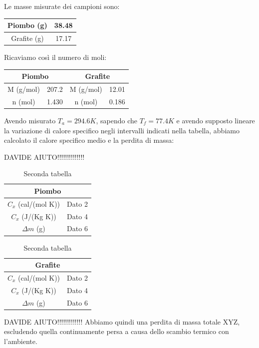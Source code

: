 \documentclass[a4paper,12pt]{article}
\begin{document}
Le masse misurate dei campioni sono:

\begin{table}[h]
    \centering
    \begin{tabular}{|c|c|} \hline
        Piombo (g) & 38.48 \\ \hline
        Grafite (g) & 17.17 \\ \hline
    \end{tabular}
\end{table}

Ricaviamo così il numero di moli:
\begin{table}[h]
    \centering
    \begin{tabular}{|c|c|c|c|} 
        \hline
        \multicolumn{2}{|c|}{\textbf{Piombo}} & \multicolumn{2}{c|}{\textbf{Grafite}} \\ \hline
        M (g/mol) & 207.2 & M (g/mol) & 12.01 \\ \hline
        n (mol) & 1.430 & n (mol) & 0.186 \\ \hline
    \end{tabular}
\end{table}

Avendo misurato $T_a = 294.6K$, sapendo che $T_f = 77.4K$ e avendo supposto lineare la variazione di calore
specifico negli intervalli indicati nella tabella, abbiamo calcolato il calore specifico medio e la perdita
di massa: 


DAVIDE AIUTO!!!!!!!!!!!!!!
\begin{table}[H]
    \centering
    \begin{minipage}{0.45\textwidth}
        \centering
        \begin{tabular}{|c|c|}
            \hline
            \multicolumn{2}{|c|}{\textbf{Piombo}} \\ \hline
            $C_x$ (cal/(mol K)) & Dato 2 \\ 
            $C_x$ (J/(Kg K)) & Dato 4 \\ \hline
            $\Delta m$ (g) & Dato 6 \\ \hline
        \end{tabular}
        \caption{Prima tabella}
    \end{minipage}
    \hfill
    \begin{minipage}{0.45\textwidth}
        \centering
        \begin{tabular}{|c|c|}
            \hline
            \multicolumn{2}{|c|}{\textbf{Grafite}} \\ \hline
            $C_x$ (cal/(mol K)) & Dato 2 \\ 
            $C_x$ (J/(Kg K)) & Dato 4 \\ \hline
            $\Delta m$ (g) & Dato 6 \\ \hline
        \end{tabular}
        \caption{Seconda tabella}
    \end{minipage}
\end{table}
DAVIDE AIUTO!!!!!!!!!!!!!
Abbiamo quindi una perdita di massa totale XYZ, escludendo quella continuamente persa a causa dello scambio
termico con l'ambiente.
\end{document}
